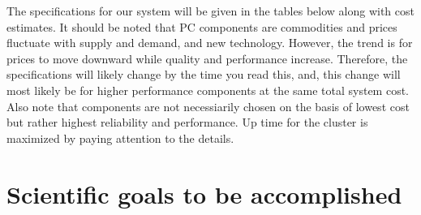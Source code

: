 The specifications for our system will be given in the tables below along with cost
estimates.  It should be noted that PC components are commodities and
prices fluctuate with supply and demand, and new technology. However,
the trend is for prices to move downward while quality and performance
increase. Therefore, the specifications will likely change by the time
you read this, and, this change will most likely be for higher
performance components at the same total system cost. Also note that
components are not necessiarily chosen on the basis of lowest cost but rather
highest reliability and performance. Up time for the cluster
is maximized by paying attention to the details.


\section{Scientific goals to be accomplished}



